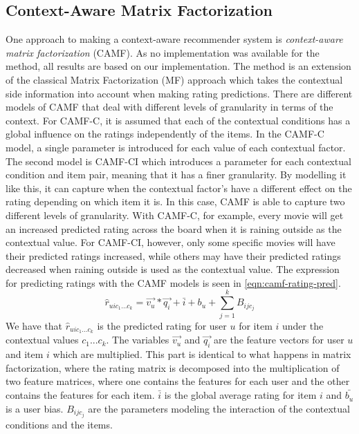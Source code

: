 \subsection{Context-Aware Matrix Factorization}
One approach to making a context-aware recommender system is \textit{context-aware matrix factorization} (CAMF)\cite{baltrunasCAMF}.
As no implementation was available for the method, all results are based on our implementation.
The method is an extension of the classical Matrix Factorization (MF) approach which takes the contextual side information into account when making rating predictions.
There are different models of CAMF that deal with different levels of granularity in terms of the context.
For CAMF-C, it is assumed that each of the contextual conditions has a global influence on the ratings independently of the items.
In the CAMF-C model, a single parameter is introduced for each value of each contextual factor.
The second model is CAMF-CI which introduces a parameter for each contextual condition and item pair, meaning that it has a finer granularity.
By modelling it like this, it can capture when the contextual factor's have a different effect on the rating depending on which item it is.
In this case, CAMF is able to capture two different levels of granularity.
With CAMF-C, for example, every movie will get an increased predicted rating across the board when it is raining outside as the contextual value.
For CAMF-CI, however, only some specific movies will have their predicted ratings increased, while others may have their predicted ratings decreased when raining outside is used as the contextual value.
The expression for predicting ratings with the CAMF models is seen in \autoref{eqn:camf-rating-pred}.
\begin{equation}
    \label{eqn:camf-rating-pred}
    \hat{r}_{uic_1...c_k} = \vec{v_u} * \vec{q_i} + \bar{i} + b_u + \sum\limits_{j = 1}^k B_{ijc_j}
\end{equation}
We have that $\hat{r}_{uic_1...c_k}$ is the predicted rating for user $u$ for item $i$ under the contextual values $c_1...c_k$.
The variables $\vec{v_u} $ and $ \vec{q_i}$ are the feature vectors for user $u$ and item $i$ which are multiplied.
This part is identical to what happens in matrix factorization, where the rating matrix is decomposed into the multiplication of two feature matrices, where one contains the features for each user and the other contains the features for each item.
$\bar{i}$ is the global average rating for item $i$ and $\bar{b_u}$ is a user bias. 
$B_{ijc_j}$ are the parameters modeling the interaction of the contextual conditions and the items.
